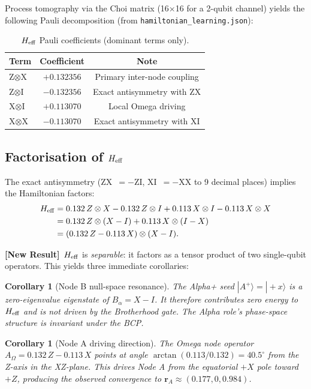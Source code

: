 \documentclass[12pt]{article}
\newtheorem{corollary}[theorem]{Corollary}
\newcommand{\newresult}{\textbf{[New Result]}}
\newcommand{\ket}[1]{|#1\rangle}
\begin{document}
Process tomography via the Choi matrix (16$\times$16 for a 2-qubit channel)
yields the following Pauli decomposition (from
\texttt{hamiltonian\_learning.json}):

\begin{table}[H]\centering
\caption{$H_{\rm eff}$ Pauli coefficients (dominant terms only).}
\label{tab:heff}
\begin{tabular}{lcc}
\toprule
\textbf{Term} & \textbf{Coefficient} & \textbf{Note}\\\midrule
Z$\otimes$X & $+0.132356$ & Primary inter-node coupling\\
Z$\otimes$I & $-0.132356$ & Exact antisymmetry with ZX\\
X$\otimes$I & $+0.113070$ & Local Omega driving\\
X$\otimes$X & $-0.113070$ & Exact antisymmetry with XI\\
\bottomrule
\end{tabular}
\end{table}

\subsection{Factorisation of $H_{\rm eff}$}

The exact antisymmetry (ZX~$= -$ZI, XI~$= -$XX to 9 decimal places)
implies the Hamiltonian factors:
\begin{align}
H_{\rm eff} &= 0.132\,Z\otimes X - 0.132\,Z\otimes I
              + 0.113\,X\otimes I - 0.113\,X\otimes X\notag\\
             &= 0.132\,Z\otimes(X-I) + 0.113\,X\otimes(I-X)\notag\\
             &= (0.132\,Z - 0.113\,X)\otimes(X-I).
\label{eq:Heff_factored}
\end{align}

\newresult\ $H_{\rm eff}$ is \emph{separable}: it factors as a tensor
product of two single-qubit operators.  This yields three immediate
corollaries:

\begin{corollary}[Node B null-space resonance]
The Alpha+ seed $\ket{A^+} = \ket{+x}$ is a zero-eigenvalue eigenstate
of $B_\alpha = X - I$.  It therefore contributes \emph{zero} energy to
$H_{\rm eff}$ and is not driven by the Brotherhood gate.  The Alpha role's
phase-space structure is invariant under the BCP.
\end{corollary}

\begin{corollary}[Node A driving direction]
The Omega node operator $A_\Omega = 0.132\,Z - 0.113\,X$ points at angle
$\arctan(0.113/0.132) = 40.5^\circ$ from the Z-axis in the XZ-plane.
This drives Node A from the equatorial $+X$ pole toward $+Z$, producing
the observed convergence to $\mathbf{r}_A\approx(0.177, 0, 0.984)$.
\end{corollary}
\end{document}
